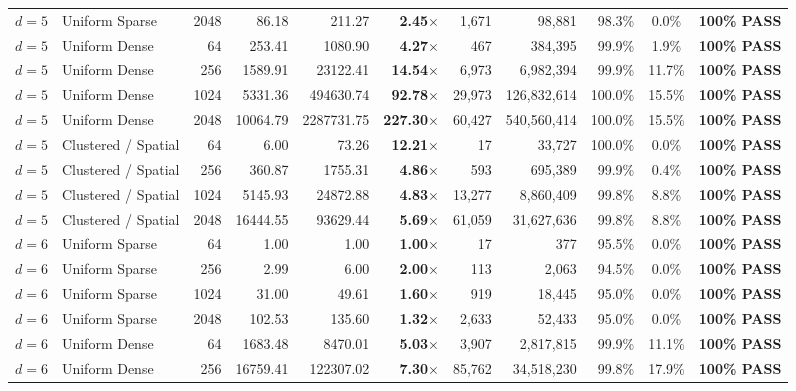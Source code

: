 \begin{table}[t]
\begin{tabular}{llr rrrrr rcc}
$d = 5$ & Uniform Sparse & 2048 & 86.18 & 211.27 & \textbf{2.45$\times$} & 1,671 & 98,881 & 98.3\% & 0.0\% & \textbf{100\% PASS} \\
$d = 5$ & Uniform Dense & 64 & 253.41 & 1080.90 & \textbf{4.27$\times$} & 467 & 384,395 & 99.9\% & 1.9\% & \textbf{100\% PASS} \\
$d = 5$ & Uniform Dense & 256 & 1589.91 & 23122.41 & \textbf{14.54$\times$} & 6,973 & 6,982,394 & 99.9\% & 11.7\% & \textbf{100\% PASS} \\
$d = 5$ & Uniform Dense & 1024 & 5331.36 & 494630.74 & \textbf{92.78$\times$} & 29,973 & 126,832,614 & 100.0\% & 15.5\% & \textbf{100\% PASS} \\
$d = 5$ & Uniform Dense & 2048 & 10064.79 & 2287731.75 & \textbf{227.30$\times$} & 60,427 & 540,560,414 & 100.0\% & 15.5\% & \textbf{100\% PASS} \\
$d = 5$ & Clustered / Spatial & 64 & 6.00 & 73.26 & \textbf{12.21$\times$} & 17 & 33,727 & 100.0\% & 0.0\% & \textbf{100\% PASS} \\
$d = 5$ & Clustered / Spatial & 256 & 360.87 & 1755.31 & \textbf{4.86$\times$} & 593 & 695,389 & 99.9\% & 0.4\% & \textbf{100\% PASS} \\
$d = 5$ & Clustered / Spatial & 1024 & 5145.93 & 24872.88 & \textbf{4.83$\times$} & 13,277 & 8,860,409 & 99.8\% & 8.8\% & \textbf{100\% PASS} \\
$d = 5$ & Clustered / Spatial & 2048 & 16444.55 & 93629.44 & \textbf{5.69$\times$} & 61,059 & 31,627,636 & 99.8\% & 8.8\% & \textbf{100\% PASS} \\
\midrule
$d = 6$ & Uniform Sparse & 64 & 1.00 & 1.00 & \textbf{1.00$\times$} & 17 & 377 & 95.5\% & 0.0\% & \textbf{100\% PASS} \\
$d = 6$ & Uniform Sparse & 256 & 2.99 & 6.00 & \textbf{2.00$\times$} & 113 & 2,063 & 94.5\% & 0.0\% & \textbf{100\% PASS} \\
$d = 6$ & Uniform Sparse & 1024 & 31.00 & 49.61 & \textbf{1.60$\times$} & 919 & 18,445 & 95.0\% & 0.0\% & \textbf{100\% PASS} \\
$d = 6$ & Uniform Sparse & 2048 & 102.53 & 135.60 & \textbf{1.32$\times$} & 2,633 & 52,433 & 95.0\% & 0.0\% & \textbf{100\% PASS} \\
$d = 6$ & Uniform Dense & 64 & 1683.48 & 8470.01 & \textbf{5.03$\times$} & 3,907 & 2,817,815 & 99.9\% & 11.1\% & \textbf{100\% PASS} \\
$d = 6$ & Uniform Dense & 256 & 16759.41 & 122307.02 & \textbf{7.30$\times$} & 85,762 & 34,518,230 & 99.8\% & 17.9\% & \textbf{100\% PASS} \\

\end{tabular}
\end{table}
